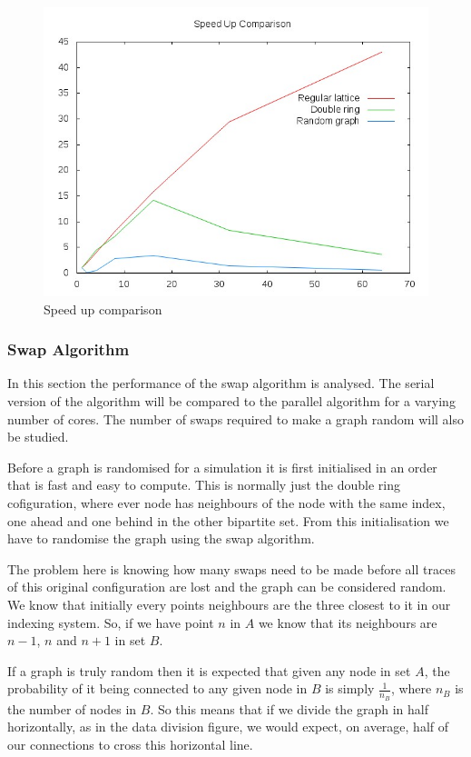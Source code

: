 \documentclass[pdftex,12pt,a4paper]{article}
\begin{document}
\begin{figure}
\centering
\includegraphics[scale=0.8]{comp.jpg}
\caption{Speed up comparison}
\end{figure}


\subsubsection{Swap Algorithm}

In this section the performance of the swap algorithm is analysed. The serial version of the algorithm will be compared to the parallel algorithm for a varying number of cores. The number of swaps required to make a graph random will also be studied.



Before a graph is randomised for a simulation it is first initialised in an order that is fast and easy to compute. This is normally just the double ring cofiguration, where ever node has neighbours of the node with the same index, one ahead and one behind in the other bipartite set. From this initialisation we have to randomise the graph using the swap algorithm.

The problem here is knowing how many swaps need to be made before all traces of this original configuration are lost and the graph can be considered random. We know that initially every points neighbours are the three closest to it in our indexing system. So, if we have point $n$ in $A$ we know that its neighbours are $n-1$, $n$ and $n+1$ in set $B$.

If a graph is truly random then it is expected that given any node in set $A$, the probability of it being connected to any given node in $B$ is simply $\frac{1}{n_B}$, where $n_B$ is the number of nodes in $B$. So this means that if we divide the graph in half horizontally, as in the data division figure, we would expect, on average, half of our connections to cross this horizontal line.
\end{document}
